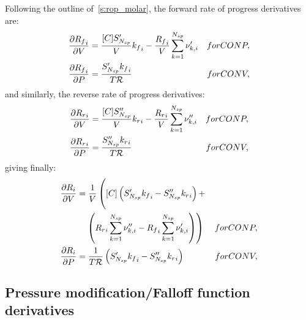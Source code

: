 \documentclass[12pt]{article}
\newcommand{\ns}{N_{sp}}
\newcommand{\conp}{CONP}
\newcommand{\conv}{CONV}
\newcommand{\dconp}{\ifmmode\text{for \conp,}\else for \conp,\fi}
\newcommand{\dconv}{\ifmmode\text{for \conv,}\else for \conv,\fi}
\newcommand{\Ru}{\mathcal{R}}
\begin{document}
Following the outline of~\cref{s:rop_molar}, the forward rate of progress derivatives are:
\begin{subequations}
 \begin{align}
  \frac{\partial {R_f}_{i} }{\partial V } &= \frac{[C] S^{\prime}_{\ns}}{V} {k_f}_{i} - \frac{{R_f}_{i}}{V} \sum_{k=1}^{\ns} \nu^{\prime}_{k,i}&\dconp\\
  \frac{\partial {R_f}_{i} }{\partial P } &= \frac{S^{\prime}_{\ns} {k_f}_{i}}{T \Ru}&\dconv
 \end{align}
\end{subequations}
and similarly, the reverse rate of progress derivatives:
\begin{subequations}
 \begin{align}
  \frac{\partial {R_r}_{i} }{\partial V } &= \frac{[C] S^{\prime\prime}_{\ns}}{V} {k_r}_{i} - \frac{{R_r}_{i}}{V} \sum_{k=1}^{\ns} \nu^{\prime\prime}_{k,i}&\dconp\\
  \frac{\partial {R_r}_{i} }{\partial P } &= \frac{S^{\prime\prime}_{\ns} {k_r}_{i}}{T \Ru}&\dconv
 \end{align}
\end{subequations}
giving finally:
\begin{subequations}
 \label{e:dropi_de}
 \begin{align}
  \frac{\partial {R}_{i} }{\partial V } &= \frac{1}{V}\left(\vphantom{{R_r}_{i} \sum_{k=1}^{\ns} \nu^{\prime\prime}_{k,i}} [C]\left(S^{\prime}_{\ns} {k_f}_{i} - S^{\prime\prime}_{\ns} {k_r}_{i}\right) + \right.& \nonumber\\
  &\left. \quad\left({R_r}_{i} \sum_{k=1}^{\ns} \nu^{\prime\prime}_{k,i} - {R_f}_{i} \sum_{k=1}^{\ns} \nu^{\prime}_{k,i}\right) \right)&\dconp\\
  \frac{\partial {R}_{i} }{\partial P } &= \frac{1}{T \Ru} \left(S^{\prime}_{\ns} {k_f}_{i} - S^{\prime\prime}_{\ns} {k_r}_{i}\right)&\dconv
 \end{align}
\end{subequations}

\subsection{Pressure modification\slash Falloff function derivatives}
\end{document}
